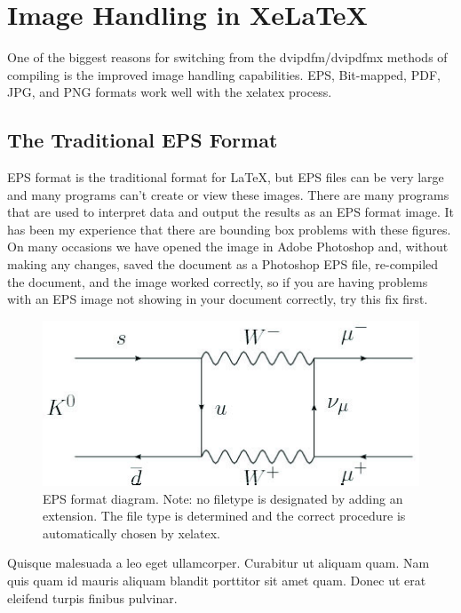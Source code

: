 \section{Image Handling in XeLaTeX}

One of the biggest reasons for switching from the dvipdfm/dvipdfmx methods of compiling is the improved image handling capabilities. EPS, Bit-mapped, PDF, JPG, and PNG formats work well with the xelatex process.

\subsection{The Traditional EPS Format}

EPS format is the traditional format for LaTeX, but EPS files can be very large and many programs can't create or view these images. There are many programs that are used to interpret data and output the results as an EPS format image. It has been my experience that there are bounding box problems with these figures. On many occasions we have opened the image in Adobe Photoshop and, without making any changes, saved the document as a Photoshop EPS file, re-compiled the document, and the image worked correctly, so if you are having problems with an EPS image not showing in your document correctly, try this fix first.


\begin{figure}[htbp]
  \centering
    \includegraphics[width=5in]{images/diagram}
    \caption[EPS format diagram. Note: no filetype is designated by adding an extension.]{EPS format diagram. Note: no filetype is designated by adding an extension. The file type is determined and the correct procedure is automatically chosen by xelatex.}
\end{figure}


Quisque malesuada a leo eget ullamcorper. Curabitur ut aliquam quam. Nam quis quam id mauris aliquam blandit porttitor sit amet quam. Donec ut erat eleifend turpis finibus pulvinar.

